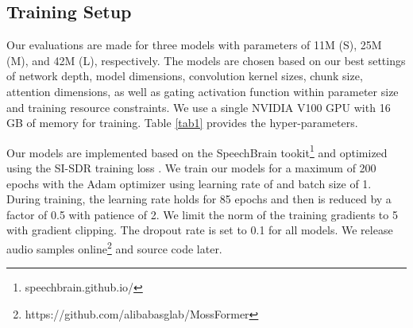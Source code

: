 \documentclass[9pt]{extarticle}
\begin{document}
\subsection{Training Setup}
Our evaluations are made for three models with parameters of 11M (S), 25M (M), and 42M (L), respectively. The models are chosen based on our best settings of network depth, model dimensions, convolution kernel sizes, chunk size, attention dimensions, as well as gating activation function  within parameter size and training resource constraints. We use a single NVIDIA V100 GPU with 16 GB of memory for training. Table \ref{tab1} provides the hyper-parameters.

Our models are implemented based on the SpeechBrain tookit\footnote{speechbrain.github.io/} and  optimized using the SI-SDR training loss \cite{Roux2019S}. We train our models for a maximum of 200 epochs with the Adam optimizer \cite{Kingma2014J} using learning rate of  and batch size of 1. 
During training, the learning rate holds for 85 epochs and then is reduced by a factor of 0.5 with patience of 2. We limit the  norm of the training gradients to 5 with gradient clipping. The dropout rate is set to 0.1 for all models. We release audio samples online\footnote{https://github.com/alibabasglab/MossFormer} and source code later.
\end{document}
